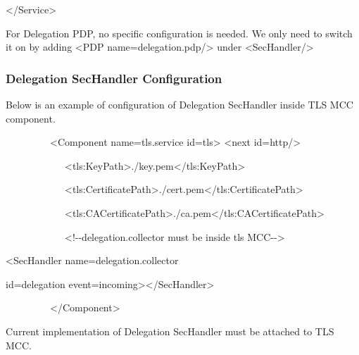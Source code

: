 \documentclass[a4paper]{article}
\begin{document}
{\ttfamily\color{black}
{\textless}/Service{\textgreater}}

{\upshape\color{black}
For Delegation PDP, no specific configuration is needed. We only need to
switch it on by adding {\textless}PDP
name={\textquotedbl}delegation.pdp{\textquotedbl}/{\textgreater} under
{\textless}SecHandler/{\textgreater}}

\subsubsection[Delegation SecHandler Configuration]{Delegation
SecHandler Configuration}
{\upshape\color{black}
Below is an example of configuration of Delegation SecHandler inside TLS
MCC component.}

{\ttfamily\color{black}
\ \ \ \ \ \ \ \ \ {\textless}Component
name={\textquotedbl}tls.service{\textquotedbl}
id={\textquotedbl}tls{\textquotedbl}{\textgreater} {\textless}next
id={\textquotedbl}http{\textquotedbl}/{\textgreater}}

{\ttfamily\color{black}
\ \ \ \ \ \ \ \ \ \ \ \ {\textless}tls:KeyPath{\textgreater}./key.pem{\textless}/tls:KeyPath{\textgreater}}

{\ttfamily\color{black}
\ \ \ \ \ \ \ \ \ \ \ \ {\textless}tls:CertificatePath{\textgreater}./cert.pem{\textless}/tls:CertificatePath{\textgreater}}

{\ttfamily\color{black}
\ \ \ \ \ \ \ \ \ \ \ \ {\textless}tls:CACertificatePath{\textgreater}./ca.pem{\textless}/tls:CACertificatePath{\textgreater}}

{\ttfamily\color{black}
\ \ \ \ \ \ \ \ \ \ \ \ {\textless}!-{}-delegation.collector must be
inside tls MCC-{}-{\textgreater}}

{\ttfamily\color{black}
{\textless}SecHandler
name={\textquotedbl}delegation.collector{\textquotedbl} }

{\ttfamily\color{black}
id={\textquotedbl}delegation{\textquotedbl}
event={\textquotedbl}incoming{\textquotedbl}{\textgreater}{\textless}/SecHandler{\textgreater}}

{\ttfamily\color{black}
\ \ \ \ \ \ \ \ \ {\textless}/Component{\textgreater}}

{\upshape\color{black}
Current implementation of Delegation\textbf{ }SecHandler must be
attached to TLS MCC. }
\end{document}
